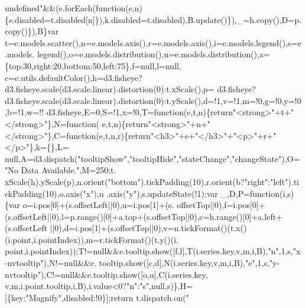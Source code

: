 \begin{DoxyCode}
{      undefined"}&&(e.forEach(function(e,n)\{e.disabled=t.disabled[n]\}),k.disabled=t.disabled),B.update()\}),\_=h.copy(),D=p.
      copy()\}),B\}var t=e.models.scatter(),n=e.models.axis(),r=e.models.axis(),i=e.models.legend(),s=e.models.
      legend(),o=e.models.distribution(),u=e.models.distribution(),a=\{top:30,right:20,bottom:50,left:75\},f=null,l=null,
      c=e.utils.defaultColor(),h=d3.fisheye?d3.fisheye.scale(d3.scale.linear).distortion(0):t.xScale(),p=
      d3.fisheye?d3.fisheye.scale(d3.scale.linear).distortion(0):t.yScale(),d=!1,v=!1,m=!0,g=!0,y=!0,b=!1,w=!!
      d3.fisheye,E=0,S=!1,x=!0,T=\textcolor{keyword}{function}(e,t,n)\{\textcolor{keywordflow}{return}\textcolor{stringliteral}{"<strong>"}+t+\textcolor{stringliteral}{"</strong>"}\},N=\textcolor{keyword}{function}(
      e,t,n)\{\textcolor{keywordflow}{return}\textcolor{stringliteral}{"<strong>"}+n+\textcolor{stringliteral}{"</strong>"}\},C=\textcolor{keyword}{function}(e,t,n,r)\{\textcolor{keywordflow}{return}\textcolor{stringliteral}{"<h3>"}+e+\textcolor{stringliteral}{"</h3>"}+\textcolor{stringliteral}{"<p>"}+r+\textcolor{stringliteral}{"</p>"}\},k=\{\},L=
      null,A=d3.dispatch(\textcolor{stringliteral}{"tooltipShow"},\textcolor{stringliteral}{"tooltipHide"},\textcolor{stringliteral}{"stateChange"},\textcolor{stringliteral}{"changeState"}),O=\textcolor{stringliteral}{"No Data Available."},M=250;t.
      xScale(h).yScale(p),n.orient(\textcolor{stringliteral}{"bottom"}).tickPadding(10),r.orient(b?\textcolor{stringliteral}{"right"}:\textcolor{stringliteral}{"left"}).tickPadding(10),o.axis(\textcolor{stringliteral}{"x"}),u
      .axis(\textcolor{stringliteral}{"y"}),s.updateState(!1);var \_,D,P=\textcolor{keyword}{function}(i,s)\{var o=i.pos[0]+(s.offsetLeft||0),u=i.pos[1]+(s.
      offsetTop||0),f=i.pos[0]+(s.offsetLeft||0),l=p.range()[0]+a.top+(s.offsetTop||0),c=h.range()[0]+a.left+(s.offsetLeft
      ||0),d=i.pos[1]+(s.offsetTop||0),v=n.tickFormat()(t.x()(i.point,i.pointIndex)),m=r.tickFormat()(t.y()(i.
      point,i.pointIndex));T!=null&&e.tooltip.show([f,l],T(i.series.key,v,m,i,B),\textcolor{stringliteral}{"n"},1,s,\textcolor{stringliteral}{"x-nvtooltip"}),N!=null&&e.
      tooltip.show([c,d],N(i.series.key,v,m,i,B),\textcolor{stringliteral}{"e"},1,s,\textcolor{stringliteral}{"y-nvtooltip"}),C!=null&&e.tooltip.show([o,u],C(i.series.key,
      v,m,i.point.tooltip,i,B),i.value<0?\textcolor{stringliteral}{"n"}:\textcolor{stringliteral}{"s"},null,s)\},H=[\{key:\textcolor{stringliteral}{"Magnify"},disabled:!0\}];\textcolor{keywordflow}{return} t.dispatch.on(\textcolor{stringliteral}{"
}
\end{DoxyCode}
